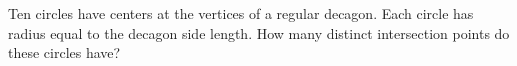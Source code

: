 Ten circles have centers at the vertices of a regular decagon. Each circle has radius equal to the decagon side length. How many distinct intersection points do these circles have?
